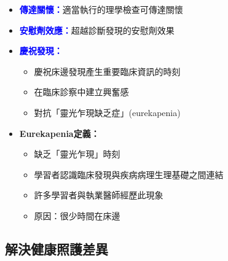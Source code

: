 \documentclass[11pt,a4paper]{article}
\begin{document}
\begin{itemize}
    \item \textcolor{blue}{\textbf{傳達關懷：}}適當執行的理學檢查可傳達關懷
    \item \textcolor{blue}{\textbf{安慰劑效應：}}超越診斷發現的安慰劑效果
    \item \textcolor{blue}{\textbf{慶祝發現：}}
    \begin{itemize}
        \item 慶祝床邊發現產生重要臨床資訊的時刻
        \item 在臨床診察中建立興奮感
        \item 對抗「靈光乍現缺乏症」(eurekapenia)
    \end{itemize}
    \item \textbf{Eurekapenia定義：}
    \begin{itemize}
        \item 缺乏「靈光乍現」時刻
        \item 學習者認識臨床發現與疾病病理生理基礎之間連結
        \item 許多學習者與執業醫師經歷此現象
        \item 原因：很少時間在床邊
    \end{itemize}
\end{itemize}

\subsection{解決健康照護差異}
\end{document}
